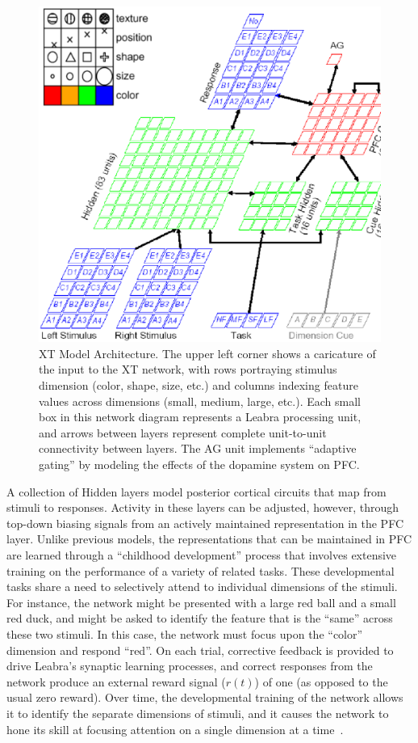 \begin{figure}
\begin{center}
	\includegraphics[width=125mm]{figures/xt_arch_2.ps}
\end{center}
\caption{XT Model Architecture.  The upper left corner shows a
         caricature of the input to the XT network, with rows
         portraying stimulus dimension (color, shape, size, etc.) and
         columns indexing feature values across dimensions (small,
         medium, large, etc.).  Each small box in this network diagram represents a Leabra processing unit, and arrows between layers represent complete unit-to-unit connectivity between layers.  The AG unit implements ``adaptive gating'' by modeling the effects of the dopamine system on PFC.}
\label{xt-layout-figure}
\end{figure} 

A collection of Hidden layers model posterior cortical circuits that
map from stimuli to responses.  Activity in these layers can be
adjusted, however, through top-down biasing signals from an actively
maintained representation in the PFC layer.  Unlike previous models,
the representations that can be maintained in PFC are learned through
a ``childhood development'' process that involves extensive training
on the performance of a variety of related tasks.  These developmental tasks
share a need to selectively attend to individual dimensions of the
stimuli.  For instance, the network might be presented with a large
red ball and a small red duck, and might be asked to identify the
feature that is the ``same'' across these two stimuli.  In this case,
the network must focus upon the ``color'' dimension and respond
``red''.  On each trial, corrective feedback is provided to drive
Leabra's synaptic learning processes, and correct responses from the
network produce an external reward signal ($r(t)$) of one (as opposed
to the usual zero reward).  Over time, the developmental training of
the network allows it to identify the separate dimensions of stimuli,
and it causes the network to hone its skill at focusing attention on a
single dimension at a time~\cite{RougierNP:2005:XT}.

